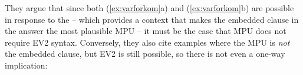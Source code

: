 \documentclass[output=paper]{langsci/langscibook}
\begin{document}

They argue that since both (\ref{ex:varforkom}a) and (\ref{ex:varforkom}b) are possible in response to the  -- which provides a context that makes the embedded clause in the answer the most plausible MPU -- it must be the case that MPU does not require EV2 syntax. Conversely, they also cite examples where the MPU is \emph{not} the embedded clause, but EV2 is still possible, so there is not even a one-way implication:
\end{document}
